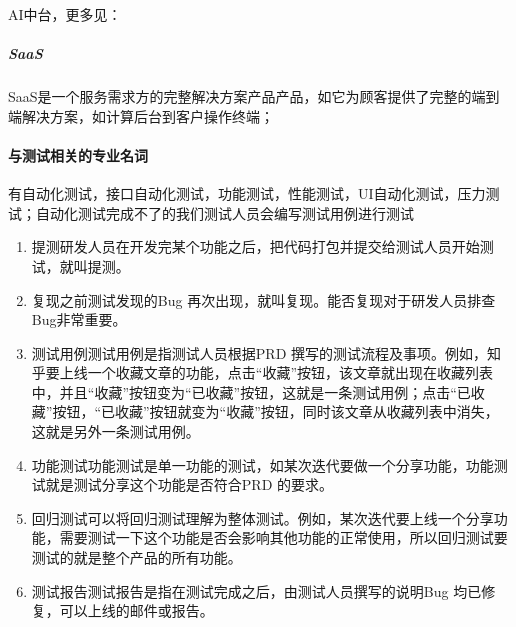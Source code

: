 \documentclass[letterpaper,11pt,english]{sphinxmanual}
\begin{document}
AI中台，更多见：


\subparagraph{SaaS}
\label{\detokenize{chapter_idea/understand_tech:saas}}
SaaS是一个服务需求方的完整解决方案产品产品，如它为顾客提供了完整的端到端解决方案，如计算后台到客户操作终端；%
\begin{footnote}[373]\sphinxAtStartFootnote
{}
%
\end{footnote}


\paragraph{与测试相关的专业名词}
\label{\detokenize{chapter_idea/understand_tech:id29}}
有自动化测试，接口自动化测试，功能测试，性能测试，UI自动化测试，压力测试；自动化测试完成不了的我们测试人员会编写测试用例进行测试%
\begin{footnote}[374]\sphinxAtStartFootnote
{}
%
\end{footnote}
\begin{enumerate}
%
\item {} 
提测研发人员在开发完某个功能之后，把代码打包并提交给测试人员开始测试，就叫提测。

\item {} 
复现之前测试发现的Bug
再次出现，就叫复现。能否复现对于研发人员排查Bug非常重要。

\item {} 
测试用例测试用例是指测试人员根据PRD
撰写的测试流程及事项。例如，知乎要上线一个收藏文章的功能，点击“收藏”按钮，该文章就出现在收藏列表中，并且“收藏”按钮变为“已收藏”按钮，这就是一条测试用例；点击“已收藏”按钮，“已收藏”按钮就变为“收藏”按钮，同时该文章从收藏列表中消失，这就是另外一条测试用例。

\item {} 
功能测试功能测试是单一功能的测试，如某次迭代要做一个分享功能，功能测试就是测试分享这个功能是否符合PRD
的要求。

\item {} 
回归测试可以将回归测试理解为整体测试。例如，某次迭代要上线一个分享功能，需要测试一下这个功能是否会影响其他功能的正常使用，所以回归测试要测试的就是整个产品的所有功能。

\item {} 
测试报告测试报告是指在测试完成之后，由测试人员撰写的说明Bug
均已修复，可以上线的邮件或报告。

\end{enumerate}
\end{document}
